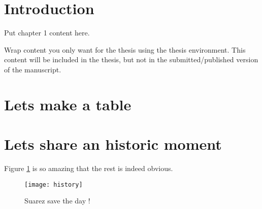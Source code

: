 
\section{Introduction}
Put chapter 1 content here.

\begin{thesis}
Wrap content you only want for the thesis using the thesis environment.  
This content will be included in the thesis, 
but not in the submitted/published version of the manuscript.
\end{thesis}

\section{Lets make a table} 
 

\section{Lets share an historic moment}

Figure \ref{history} is so amazing  that the rest is indeed obvious.

\begin{figure}[h!tb] \centering
\texttt{[image: history]}
\caption{Suarez save the day !}
\label{history}
\end{figure}
